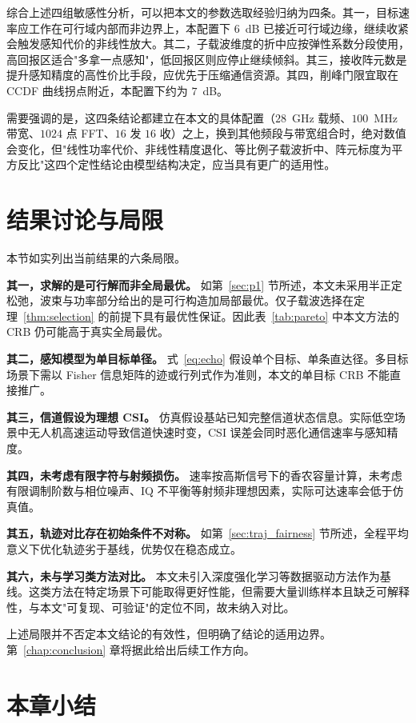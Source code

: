 综合上述四组敏感性分析，可以把本文的参数选取经验归纳为四条。其一，目标速率应工作在可行域内部而非边界上，本配置下 $6$~dB 已接近可行域边缘，继续收紧会触发感知代价的非线性放大。其二，子载波维度的折中应按弹性系数分段使用，高回报区适合"多拿一点感知"，低回报区则应停止继续倾斜。其三，接收阵元数是提升感知精度的高性价比手段，应优先于压缩通信资源。其四，削峰门限宜取在 CCDF 曲线拐点附近，本配置下约为 $7$~dB。

需要强调的是，这四条结论都建立在本文的具体配置（$28$~GHz 载频、$100$~MHz 带宽、$1024$ 点 FFT、$16$ 发 $16$ 收）之上，换到其他频段与带宽组合时，绝对数值会变化，但"线性功率代价、非线性精度退化、等比例子载波折中、阵元标度为平方反比"这四个定性结论由模型结构决定，应当具有更广的适用性。

\section{结果讨论与局限}
\label{sec:limitation}

本节如实列出当前结果的六条局限。

\textbf{其一，求解的是可行解而非全局最优。} 如第~\ref{sec:p1} 节所述，本文未采用半正定松弛，波束与功率部分给出的是可行构造加局部最优。仅子载波选择在定理~\ref{thm:selection} 的前提下具有最优性保证。因此表~\ref{tab:pareto} 中本文方法的 CRB 仍可能高于真实全局最优。

\textbf{其二，感知模型为单目标单径。} 式~\eqref{eq:echo} 假设单个目标、单条直达径。多目标场景下需以 Fisher 信息矩阵的迹或行列式作为准则，本文的单目标 CRB 不能直接推广。

\textbf{其三，信道假设为理想 CSI。} 仿真假设基站已知完整信道状态信息。实际低空场景中无人机高速运动导致信道快速时变，CSI 误差会同时恶化通信速率与感知精度。

\textbf{其四，未考虑有限字符与射频损伤。} 速率按高斯信号下的香农容量计算，未考虑有限调制阶数与相位噪声、IQ 不平衡等射频非理想因素，实际可达速率会低于仿真值。

\textbf{其五，轨迹对比存在初始条件不对称。} 如第~\ref{sec:traj_fairness} 节所述，全程平均意义下优化轨迹劣于基线，优势仅在稳态成立。

\textbf{其六，未与学习类方法对比。} 本文未引入深度强化学习等数据驱动方法作为基线。这类方法在特定场景下可能取得更好性能，但需要大量训练样本且缺乏可解释性，与本文"可复现、可验证"的定位不同，故未纳入对比。

上述局限并不否定本文结论的有效性，但明确了结论的适用边界。第~\ref{chap:conclusion} 章将据此给出后续工作方向。

\section{本章小结}
\label{sec:exp_summary}

